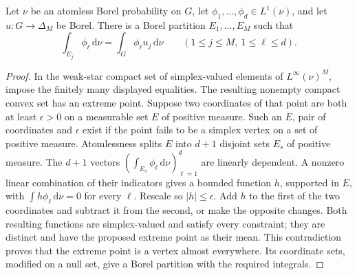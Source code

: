 \begin{lemma}\label{lem:v33-purification}
Let $\nu$ be an atomless Borel probability on $G$, let
$\phi_1,\ldots,\phi_d\in L^1(\nu)$, and let
$u:G\to\Delta_M$ be Borel. There is a Borel partition
$E_1,\ldots,E_M$ such that
\[
 \int_{E_j}\phi_\ell\,\mathrm d\nu
       =\int_G\phi_\ell u_j\,\mathrm d\nu
              \qquad(1\le j\le M,\ 1\le\ell\le d).
\]
\end{lemma}
\begin{proof}
In the weak-star compact set of simplex-valued elements of
$L^\infty(\nu)^M$, impose the finitely many displayed equalities.
The resulting nonempty compact convex set has an extreme point.
Suppose two coordinates of that point are both at least $\epsilon>0$
on a measurable set $E$ of positive measure. Such an $E$, pair of
coordinates and $\epsilon$ exist if the point fails to be a simplex
vertex on a set of positive measure. Atomlessness splits $E$ into
$d+1$ disjoint sets $E_s$ of positive measure. The $d+1$ vectors
$(\int_{E_s}\phi_\ell\,\mathrm d\nu)_{\ell=1}^d$ are linearly
dependent. A nonzero linear combination of their indicators gives
a bounded function $h$, supported in $E$, with
$\int h\phi_\ell\,\mathrm d\nu=0$ for every $\ell$. Rescale so
$|h|\le\epsilon$. Add $h$ to the first of the two coordinates and
subtract it from the second, or make the opposite changes. Both
resulting functions are simplex-valued and satisfy every constraint;
they are distinct and have the proposed extreme point as their mean.
This contradiction proves that the extreme point is a vertex almost
everywhere. Its coordinate sets, modified on a null set, give a Borel
partition with the required integrals.
\end{proof}

